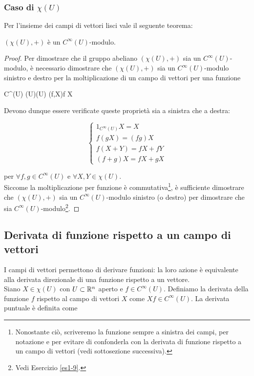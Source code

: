 \subsubsection{Caso di $ \chi(U) $}

Per l'insieme dei campi di vettori lisci vale il seguente teorema:

\begin{theorem}\label{thm:chi-mod}
	$ (\chi(U),+) $ è un $ C^{\infty}(U) $-modulo.
\end{theorem}

\begin{proof}
	Per dimostrare che il gruppo abeliano $ (\chi(U),+) $ sia un $ C^{\infty}(U) $-modulo, è necessario dimostrare che $ (\chi(U),+) $ sia un $ C^{\infty}(U) $-modulo sinistro e destro per la moltiplicazione di un campo di vettori per una funzione
	
	\map{\cdot}
		{C^{\infty}(U) \times \chi(U)}{\chi(U)}
		{(f,X)}{f X}

	Devono dunque essere verificate queste proprietà sia a sinistra che a destra:

	\begin{equation}
		\begin{cases}
			1_{C^{\infty}(U)} X = X\\
			f (g X) = (f g) X\\
			f (X+Y) = f X + f Y\\
			(f+g) X = f X + g X
		\end{cases}
	\end{equation}

	per $ \forall f,g \in C^{\infty}(U) $ e $ \forall X,Y \in \chi(U) $.\\
	Siccome la moltiplicazione per funzione è commutativa\footnote{%
		Nonostante ciò, scriveremo la funzione sempre a sinistra dei campi, per notazione e per evitare di confonderla con la derivata di funzione rispetto a un campo di vettori (vedi sottosezione successiva).%
	}, è sufficiente dimostrare che $ (\chi(U),+) $ sia un $ C^{\infty}(U) $-modulo sinistro (o destro) per dimostrare che sia $ C^{\infty}(U) $-modulo\footnote{%
		Vedi Esercizio \ref{es1-9}.%
	}.
\end{proof}

\subsection{Derivata di funzione rispetto a un campo di vettori}

I campi di vettori permettono di derivare funzioni: la loro azione è equivalente alla derivata direzionale di una funzione rispetto a un vettore.\\
Siano $ X \in \chi(U) $ con $ U \subset \mathbb{R}^{n} $ aperto e $ f \in C^{\infty}(U) $. Definiamo la derivata della funzione $ f $ rispetto al campo di vettori $ X $ come $ X f \in C^{\infty}(U) $. La derivata puntuale è definita come

